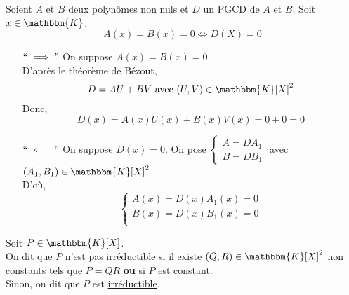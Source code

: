 \begin{prop}
	Soient $A$ et $B$ deux polynômes non nuls et $D$ un PGCD de $A$ et $B$. Soit $x \in \mathbbm{K}$.\\
	\[
		A(x) = B(x) = 0 \iff D(X) = 0
	\] 
\end{prop}

\begin{prv}
	\begin{itemize}
		\item[$``\implies"$] On suppose $A(x) = B(x) = 0$ \\
			D'après le théorème de Bézout, \[
				D = AU + BV \text{ avec } (U,V) \in \mathbbm{K}[X]^2
			\] Donc, \[
				D(x) = A(x) U(x) + B(x) V(x) = 0+0 = 0
			\] 
		\item[$``\impliedby"$ ]
			On suppose $D(x) = 0$. On pose $\begin{cases}
				A = DA_1\\
				B = DB_1
			\end{cases}$ avec $(A_1,B_1) \in \mathbbm{K}[X]^2$ \\
			D'où, \[
				\begin{cases}
					A(x) = D(x) A_1(x) = 0\\
					B(x) = D(x) B_1(x) = 0\\
				\end{cases}
			\] 
	\end{itemize}
\end{prv}

\begin{defn}
	Soit $P \in \mathbbm{K}[X]$.\\[2mm]
	On dit que $P$ \underline{n'est pas irréductible} si il existe $(Q,R)\in \mathbbm{K}[X]^2$ non constants tels que $P = QR$
	{\bf ou} si $P$ est constant.\\[2mm]
	Sinon, on dit que $P$ est \underline{irréductible}.
\end{defn}

